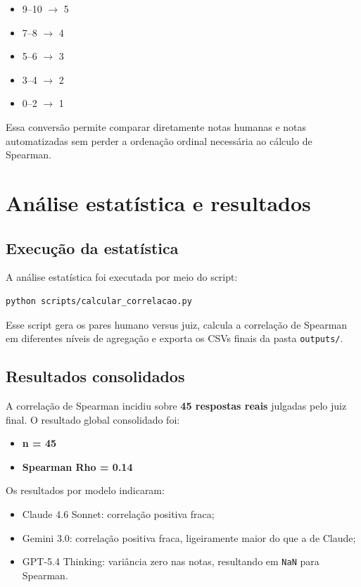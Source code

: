 \documentclass[12pt,a4paper]{article}
\begin{document}
\begin{itemize}[leftmargin=1.2cm]
    \item 9--10 $\rightarrow$ 5
    \item 7--8 $\rightarrow$ 4
    \item 5--6 $\rightarrow$ 3
    \item 3--4 $\rightarrow$ 2
    \item 0--2 $\rightarrow$ 1
\end{itemize}

Essa conversão permite comparar diretamente notas humanas e notas automatizadas sem perder a ordenação ordinal necessária ao cálculo de Spearman.

\section{Análise estatística e resultados}

\subsection{Execução da estatística}

A análise estatística foi executada por meio do script:

\begin{lstlisting}[caption={Calculo das correlacoes}]
python scripts/calcular_correlacao.py
\end{lstlisting}

Esse script gera os pares humano versus juiz, calcula a correlação de Spearman em diferentes níveis de agregação e exporta os CSVs finais da pasta \texttt{outputs/}.

\subsection{Resultados consolidados}

A correlação de Spearman incidiu sobre \textbf{45 respostas reais} julgadas pelo juiz final. O resultado global consolidado foi:

\begin{itemize}[leftmargin=1.2cm]
    \item \textbf{n = 45}
    \item \textbf{Spearman Rho = 0.14}
\end{itemize}

Os resultados por modelo indicaram:

\begin{itemize}[leftmargin=1.2cm]
    \item Claude 4.6 Sonnet: correlação positiva fraca;
    \item Gemini 3.0: correlação positiva fraca, ligeiramente maior do que a de Claude;
    \item GPT-5.4 Thinking: variância zero nas notas, resultando em \texttt{NaN} para Spearman.
\end{itemize}
\end{document}
